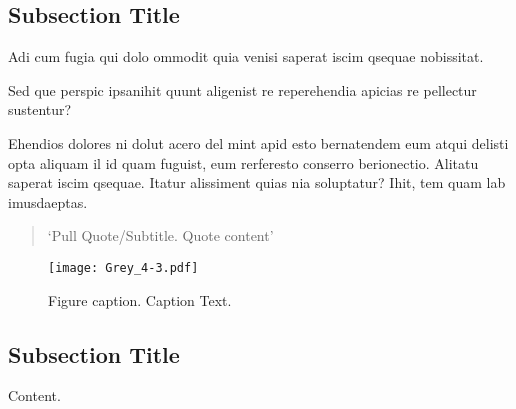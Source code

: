 \documentclass[
]{ImperialPoster}
\begin{document}

\titlesection{} %

\begin{multicols}{3} %


	\subsection{Subsection Title}

	Adi cum fugia qui dolo ommodit quia venisi saperat iscim qsequae nobissitat.

	Sed que perspic ipsanihit quunt aligenist re reperehendia \textcolor{ICLBlue}{apicias re pellectur sustentur?}

	Ehendios \textcolor{ICLBlue}{dolores} ni dolut acero del mint apid esto bernatendem eum \textcolor{ICLBlue}{atqui delisti opta} aliquam il id quam fuguist, eum rerferesto conserro berionectio. Alitatu saperat iscim qsequae. Itatur alissiment quias nia soluptatur? Ihit, tem quam lab imusdaeptas.

	\begin{quote}
		`Pull Quote/Subtitle. Quote content'
	\end{quote}

	\vspace{20pt} %

	\begin{figure}[H] %
		\texttt{[image: Grey\_4-3.pdf]} %
		\caption{Figure caption. Caption Text.}
	\end{figure}

	\subsection{Subsection Title}

	Content.


\end{multicols}
\end{document}
